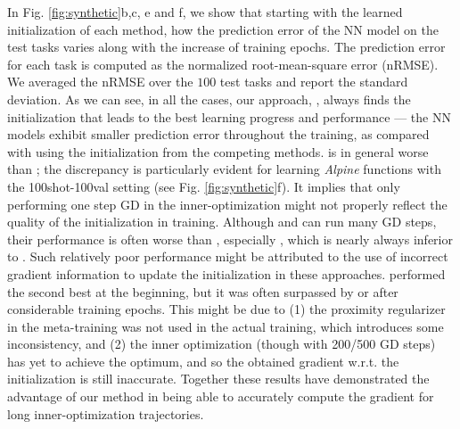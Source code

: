 In Fig. \ref{fig:synthetic}b,c, e and f, we show that starting with the learned initialization of each method, how the prediction error of the NN model on the test tasks varies along with the increase of training epochs.   The prediction error for each task is computed as the normalized root-mean-square error (nRMSE). We averaged the nRMSE over the $100$ test tasks and report the standard deviation. As we can see, in all the cases, our approach, \ours, always finds the initialization that leads to the best learning progress and performance  --- the NN models exhibit smaller prediction error throughout the training, as compared with using the initialization from the competing methods.  is in general worse than \maml; the discrepancy is particularly evident for learning \textit{Alpine} functions with the 100shot-100val setting (see Fig. \ref{fig:synthetic}f). It implies that only performing one step GD in the inner-optimization might not properly reflect the quality of the initialization in training. Although \fomaml and \rap can run many GD steps, their performance is often worse than \maml, especially \rap, which is nearly always inferior to \maml. Such relatively poor performance might be attributed to the use of incorrect gradient information to update the initialization in these approaches. \imaml performed the second best at the beginning, but it was often surpassed by \maml or \fomaml after considerable training epochs. This might be due to (1) the proximity regularizer in the meta-training was not used in the actual training, which introduces some inconsistency, and (2) the inner optimization (though with 200/500 GD steps) has yet to achieve the optimum, and so the obtained gradient w.r.t. the initialization is still inaccurate.  Together these results have demonstrated the advantage of our method in being able to accurately compute the gradient for long inner-optimization trajectories. 

\vspace{-0.05in}
